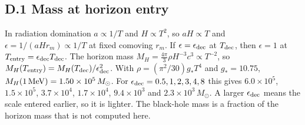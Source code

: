 \subsection*{D.1 Mass at horizon entry}\label{app:massv11}
In radiation domination $a\propto1/T$ and $H\propto T^2$, so $aH\propto T$ and $\epsilon=1/(aHr_m)\propto1/T$ at fixed comoving $r_m$. If $\epsilon=\epsilon_{\rm dec}$ at $T_{\rm dec}$, then $\epsilon=1$ at $T_{\rm entry}=\epsilon_{\rm dec}T_{\rm dec}$. The horizon mass $M_H=\tfrac{4\pi}{3}\rho H^{-3}c^3\propto T^{-2}$, so $M_H(T_{\rm entry})=M_H(T_{\rm dec})/\epsilon_{\rm dec}^2$. With $\rho=(\pi^2/30)g_*T^4$ and $g_*=10.75$, $M_H(1\,{\rm MeV})=1.50\times10^5\,M_\odot$. For $\epsilon_{\rm dec}=0.5,1,2,3,4,8$ this gives $6.0\times10^5$, $1.5\times10^5$, $3.7\times10^4$, $1.7\times10^4$, $9.4\times10^3$ and $2.3\times10^3\,M_\odot$. A larger $\epsilon_{\rm dec}$ means the scale entered earlier, so it is lighter. The black-hole mass is a fraction of the horizon mass that is not computed here.
